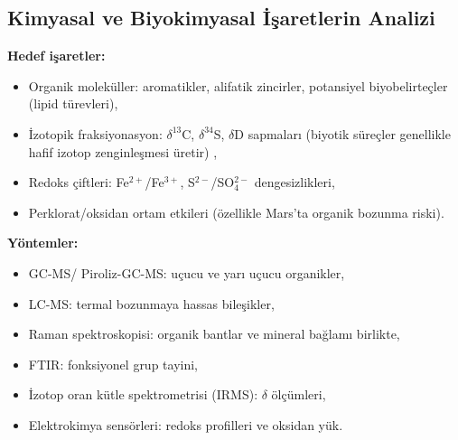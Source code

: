 \documentclass[12pt,a4paper]{article}
\begin{document}
\subsection{Kimyasal ve Biyokimyasal İşaretlerin Analizi}

\textbf{Hedef işaretler:}
\begin{itemize}
    \item Organik moleküller: aromatikler, alifatik zincirler, potansiyel biyobelirteçler (lipid türevleri),
    \item İzotopik fraksiyonasyon: $\delta^{13}$C, $\delta^{34}$S, $\delta$D sapmaları (biyotik süreçler genellikle hafif izotop zenginleşmesi üretir) \cite{schidlowski2001},
    \item Redoks çiftleri: Fe$^{2+}$/Fe$^{3+}$, S$^{2-}$/SO$_4^{2-}$ dengesizlikleri,
    \item Perklorat/oksidan ortam etkileri (özellikle Mars'ta organik bozunma riski).
\end{itemize}

\textbf{Yöntemler:}
\begin{itemize}
    \item GC-MS\@ / Piroliz-GC-MS\@: uçucu ve yarı uçucu organikler,
    \item LC-MS\@: termal bozunmaya hassas bileşikler,
    \item Raman spektroskopisi\@: organik bantlar ve mineral bağlamı birlikte,
    \item FTIR\@: fonksiyonel grup tayini,
    \item İzotop oran kütle spektrometrisi (IRMS)\@: $\delta$ ölçümleri,
    \item Elektrokimya sensörleri\@: redoks profilleri ve oksidan yük.
\end{itemize}
\end{document}
